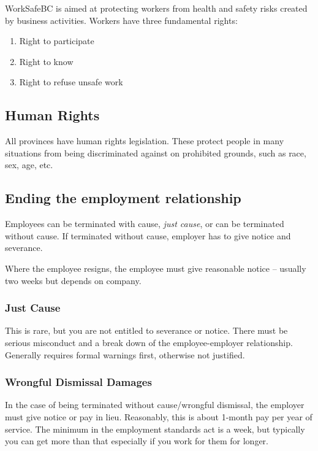 \documentclass{article}
\begin{document}
WorkSafeBC is aimed at protecting workers from health and safety risks created by business activities. Workers have three fundamental rights: \begin{enumerate} \itemsep-0.25em
\item Right to participate 
\item Right to know
\item Right to refuse unsafe work
\end{enumerate}


\subsection{Human Rights}

All provinces have human rights legislation. These protect people in many situations from being discriminated against on prohibited grounds, such as race, sex, age, etc.

\subsection{Ending the employment relationship}

Employees can be terminated with cause, \textit{just cause}, or can be terminated without cause. If terminated without cause, employer has to give notice and severance.


Where the employee resigns, the employee must give reasonable notice -- usually two weeks but depends on company.


\subsubsection{Just Cause}

This is rare, but you are not entitled to severance or notice. There must be serious misconduct and a break down of the employee-employer relationship. Generally requires formal warnings first, otherwise not justified.

\subsubsection{Wrongful Dismissal Damages}

In the case of being terminated without cause/wrongful dismissal, the employer must give notice or pay in lieu. Reasonably, this is about 1-month pay per year of service. The minimum in the employment standards act is a week, but typically you can get more than that especially if you work for them for longer.
\end{document}
